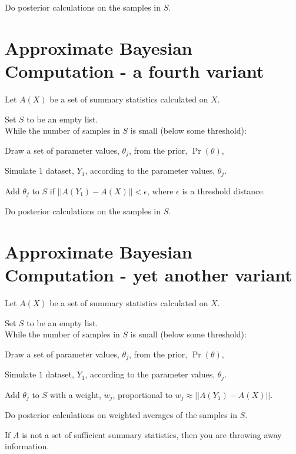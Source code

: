 {\color{grey}  Do posterior calculations on the samples in $S$.}

\myNewSlide
\section*{Approximate Bayesian Computation - a fourth variant}
Let $A(X)$ be a set of summary statistics calculated on $X$.

{\color{grey} Set $S$ to be an empty list.\\
While the number of samples in $S$ is small (below some threshold):}
\begin{compactitem}
	{\color{grey}  \item Draw a set of parameter values, $\theta_j$, from the prior, $\Pr(\theta)$,
	\item Simulate $1$ dataset, $Y_1$, according to the parameter values, $\theta_j$.}
	\item Add $\theta_j$ to $S$ if $||A(Y_1) - A(X)|| < \epsilon$, where $\epsilon$ is a threshold distance.
\end{compactitem}

{\color{grey}  Do posterior calculations on the samples in $S$.}

\myNewSlide
\section*{Approximate Bayesian Computation - yet another variant}
Let $A(X)$ be a set of summary statistics calculated on $X$.

{\color{grey} Set $S$ to be an empty list.\\
While the number of samples in $S$ is small (below some threshold):}

\begin{compactitem}
	{\color{grey}\item Draw a set of parameter values, $\theta_j$, from the prior, $\Pr(\theta)$,
	\item Simulate $1$ dataset, $Y_1$, according to the parameter values, $\theta_j$. }
	\item Add $\theta_j$ to $S$ with a weight, $w_j$, proportional to  $w_j \approx ||A(Y_1) - A(X)||$.
\end{compactitem}

{\color{grey}Do posterior calculations on weighted averages of the samples in $S$.}


\myNewSlide
If $A$ is not a set of sufficient summary statistics, then you are throwing away information.

